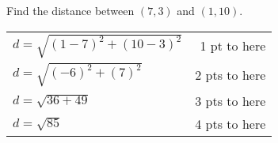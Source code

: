 
{
	Find the distance between $(7, 3)$ and $(1,10)$.
}
{
	\begin{tabular}{l r}
	$d=\sqrt{(1-7)^2+(10-3)^2}$ & 1 pt to here\\
	$d=\sqrt{(-6)^2+(7)^2}$ & 2 pts to here\\
	$d=\sqrt{36+49}$ & 3 pts to here\\
	$d=\sqrt{85}$ & 4 pts to here
	\end{tabular}
}
